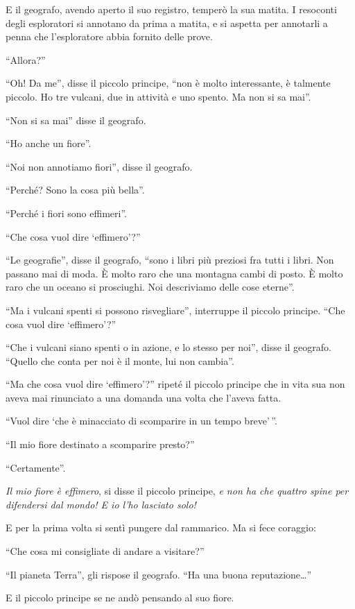 \documentclass[11pt]{scrbook}
\begin{document}
E il geografo, avendo aperto il suo registro, temperò la sua matita. I resoconti degli esploratori si annotano da prima a matita, e si aspetta per annotarli a penna che l'esploratore abbia fornito delle prove.

``Allora?''

``Oh! Da me'', disse il piccolo principe, ``non è molto interessante, è talmente piccolo. Ho tre vulcani, due in attività e uno spento. Ma non si sa mai''.

``Non si sa mai'' disse il geografo.

``Ho anche un fiore''.

``Noi non annotiamo fiori'', disse il geografo.

``Perché? Sono la cosa più bella''.

``Perché i fiori sono effimeri''.

``Che cosa vuol dire `effimero'?''

``Le geografie'', disse il geografo, ``sono i libri più preziosi fra tutti i libri. Non passano mai di moda. È molto raro che una montagna cambi di posto. È molto raro che un oceano si prosciughi. Noi descriviamo delle cose eterne''.

``Ma i vulcani spenti si possono risvegliare'', interruppe il piccolo principe. ``Che cosa vuol dire `effimero'?''

``Che i vulcani siano spenti o in azione, e lo stesso per noi'', disse il geografo. ``Quello che conta per noi è il monte, lui non cambia''.

``Ma che cosa vuol dire `effimero'?'' ripeté il piccolo principe che in vita sua non aveva mai rinunciato a una domanda una volta che l'aveva fatta.

``Vuol dire `che è minacciato di scomparire in un tempo breve'\,''.

``Il mio fiore destinato a scomparire presto?''

``Certamente''.

\emph{Il mio fiore è effimero}, si disse il piccolo principe, \emph{e non ha che quattro spine per difendersi dal mondo! E io l'ho lasciato solo!}

E per la prima volta si sentì pungere dal rammarico. Ma si fece coraggio:

``Che cosa mi consigliate di andare a visitare?''

``Il pianeta Terra'', gli rispose il geografo. ``Ha una buona reputazione\ldots{}''

E il piccolo principe se ne andò pensando al suo fiore.
\end{document}
